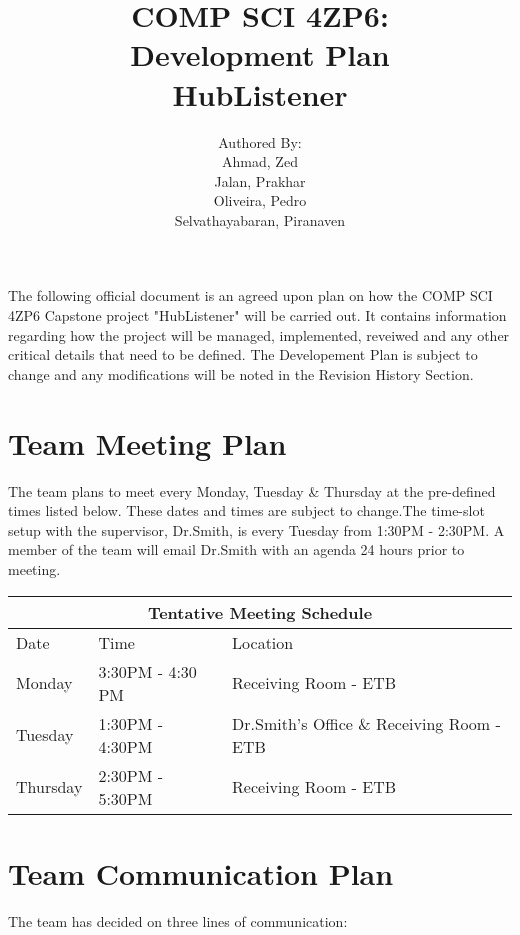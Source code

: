 \documentclass{article}
\title{COMP SCI 4ZP6:\\ Development Plan\\HubListener}
\author{ Authored By:
		\\ Ahmad, Zed
		\\ Jalan, Prakhar 
		\\ Oliveira, Pedro
		\\ Selvathayabaran, Piranaven
}
\date{}
\begin{document}
\newpage

\maketitle

The following official document is an agreed upon plan on how the COMP SCI 4ZP6 Capstone project "HubListener" will be carried out. It contains information regarding how the project will be managed, implemented, reveiwed and any other critical details that need to be defined. The Developement Plan is subject to change and any modifications will be noted in the Revision History Section. 

\tableofcontents 
\section{Team Meeting Plan}
The team plans to meet every Monday, Tuesday \& Thursday at the pre-defined times listed below. These dates and times are subject to change.The time-slot setup with the supervisor, Dr.Smith, is every Tuesday from 1:30PM - 2:30PM. A member of the team will email Dr.Smith with an agenda 24 hours prior to meeting.\newline 

\begin{tabular}{ |p{3cm}||p{3cm}|p{3cm}|  }
 \hline
 \multicolumn{3}{|c|}{Tentative Meeting Schedule} \\
 \hline
 Date &Time  & Location\\
 \hline
 Monday   & 3:30PM - 4:30 PM    & Receiving Room - ETB\\
 Tuesday &   1:30PM - 4:30PM   & Dr.Smith's Office \& Receiving Room - ETB  \\
 Thursday & 2:30PM - 5:30PM & Receiving Room - ETB\\

 \hline
\end{tabular}
\section{Team Communication Plan}

The team has decided on three lines of communication:
\end{document}
